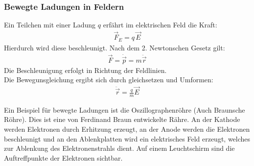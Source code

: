 \documentclass{article}
\begin{document}
\subsubsection{Bewegte Ladungen in Feldern}
Ein Teilchen mit einer Ladung $q$ erfährt im elektrischen Feld die Kraft:
\begin{align}
    \vec{F}_E=q\,\vec{E}
\end{align}
Hierdurch wird diese beschleunigt. Nach dem 2. Newtonschen Gesetz gilt:
\begin{align}
    \vec{F}=\dot{\vec{p}}=m\ddot{\vec{r}}
\end{align}
Die Beschleunigung erfolgt in Richtung der Feldlinien.\\
Die Bewegunsgleichung ergibt sich durch gleichsetzen und Umformen:
\begin{align}
    \ddot{\vec{r}}=\frac{q}{m}\vec{E}
\end{align}
\vspace{0.5cm}

\noindent Ein Beispiel für bewegte Ladungen ist die Oszillographenröhre (Auch Braunsche Röhre).
Dies ist eine von Ferdinand Braun entwickelte Rähre. An der Kathode werden Elektronen 
durch Erhitzung erzeugt, an der Anode werden die Elektronen beschleunigt und an den Ablenkplatten wird ein elektrisches 
Feld erzeugt, welches zur Ablenkung des Elektronenstrahls dient. Auf einem Leuchtschirm sind die Auftreffpunkte 
der Elektronen sichtbar.
\end{document}
